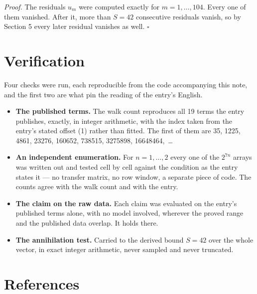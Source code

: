\documentclass[11pt]{article}
\theoremstyle{definition}
\begin{document}
{\itshape Proof.} The residuals $u_m$ were computed exactly for $m = 1,\dots,104$. Every one of them vanished. After it, more than $S = 42$ consecutive residuals vanish, so by Section 5 every later residual vanishes as well. $\square$

\section{Verification}

Four checks were run, each reproducible from the code accompanying this note, and the first two are what pin the reading of the entry's English.

\begin{itemize}

\item {\bfseries The published terms.} The walk count reproduces all 19 terms the entry publishes, exactly, in integer arithmetic, with the index taken from the entry's stated offset (1) rather than fitted. The first of them are 35, 1225, 4861, 23276, 160652, 738515, 3275898, 16648464,~\dots

\item {\bfseries An independent enumeration.} For $n = 1,\dots,2$ every one of the $2^{7n}$ arrays was written out and tested cell by cell against the condition as the entry states it --- no transfer matrix, no row window, a separate piece of code. The counts agree with the walk count and with the entry.

\item {\bfseries The claim on the raw data.} Each claim was evaluated on the entry's published terms alone, with no model involved, wherever the proved range and the published data overlap. It holds there.

\item {\bfseries The annihilation test.} Carried to the derived bound $S = 42$ over the whole vector, in exact integer arithmetic, never sampled and never truncated.

\end{itemize}

\section{References}
\end{document}
